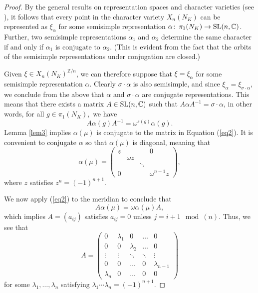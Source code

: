 \documentclass[12pt]{amsart}
\theoremstyle{plain}
\theoremstyle{remark}
\begin{document}
\begin{proof}
By the general results on representation spaces and character varieties (see \cite{LM85}),
it follows that every point in the character variety $X_n(N_K)$ can be represented
as $\xi_{\alpha}$ for some semisimple representation ${\alpha} {\colon\thinspace} \pi_1(N_K) \to {{\rm SL}}(n,{{\mathbb C}})$.
Further, two semisimple representations ${\alpha}_1$ and ${\alpha}_2$
determine the same character if and only if ${\alpha}_1$ is conjugate to ${\alpha}_2.$
(This is evident from the fact that the orbits of the semisimple representations under conjugation
are closed.)

Given $\xi \in X_n(N_K)^{{{\mathbb Z}}/n}$,
we can therefore suppose that $\xi=\xi_{\alpha}$ for some semisimple representation ${\alpha}$.
Clearly ${\sigma} \cdot {\alpha}$ is also semisimple, and
since $\xi_{\alpha} = \xi_{{\sigma} \cdot {\alpha}}$, we conclude from the above that ${\alpha}$ and ${\sigma} \cdot {\alpha}$
are conjugate representations. This means  that there exists a matrix $A  \in {{\rm SL}}(n,{{\mathbb C}})$
such that $A {\alpha} A^{-1} = {\sigma} \cdot {\alpha}$,
in other words, for all $g\in \pi_1(N_K),$ we have
\begin{equation} \label{eq2} A {\alpha}(g) A^{-1} = {\omega}^{{\varepsilon}(g)} {\alpha}(g).\end{equation}
Lemma \ref{lem3} implies
${\alpha}(\mu)$ is conjugate to  the matrix in Equation (\ref{eq2}).
It is convenient to conjugate ${\alpha}$ so that ${\alpha}(\mu)$ is diagonal,
meaning that
$${\alpha}(\mu)= \begin{pmatrix} z&&& 0 \\
 &{\omega} z  \\
&&\ddots  \\
     0&&&{\omega}^{n-1} z \end{pmatrix},
$$
where $z$ satisfies $z^n=(-1)^{n+1}$.

We now apply (\ref{eq2}) to the meridian to conclude that
$$A {\alpha}(\mu) = {\omega} {\alpha}(\mu) A,$$
 which implies
$A = (a_{ij})$ satisfies $a_{ij}=0$ unless $j = i+1 \mod(n).$
Thus, we see that
$$A = \begin{pmatrix} 0&{\lambda}_1&0& \dots &0 \\
0&0&{\lambda}_2&\dots &0 \\
 \vdots& \vdots & \ddots& \ddots &\vdots \\
 0&0&\dots&0&{\lambda}_{n-1}\\
 {\lambda}_n & 0 & \dots &0 &0
\end{pmatrix}$$
for some ${\lambda}_1, \ldots, {\lambda}_n$ satisfying ${\lambda}_1 \cdots {\lambda}_n = (-1)^{n+1}.$


\end{proof}
\end{document}
